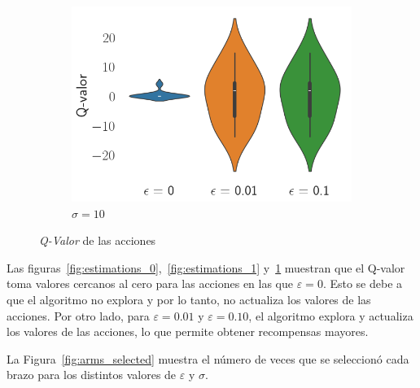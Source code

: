 \documentclass[12pt]{article}
\begin{document}
\begin{figure}[H]
\begin{subfigure}[H]{0.3\textwidth}
            \includegraphics[width=\textwidth]{../img/values_sigma_10}
            \caption{$\sigma=10$}
            \label{fig:estimations_2}
        \end{subfigure}

        \caption{\textit{Q-Valor} de las acciones}
        \label{fig:estimations}
    \end{figure}

    Las figuras~\ref{fig:estimations_0},~\ref{fig:estimations_1} y~\ref{fig:estimations_2} muestran que el Q-valor toma valores cercanos al cero para las acciones en las que $\varepsilon = 0$.
    Esto se debe a que el algoritmo no explora y por lo tanto, no actualiza los valores de las acciones.
    Por otro lado, para $\varepsilon = 0.01$ y $\varepsilon = 0.10$, el algoritmo explora y actualiza los valores de las acciones, lo que permite obtener recompensas mayores.

    La Figura~\ref{fig:arms_selected} muestra el número de veces que se seleccionó cada brazo para los distintos valores de $\varepsilon$ y $\sigma$.
\end{document}
